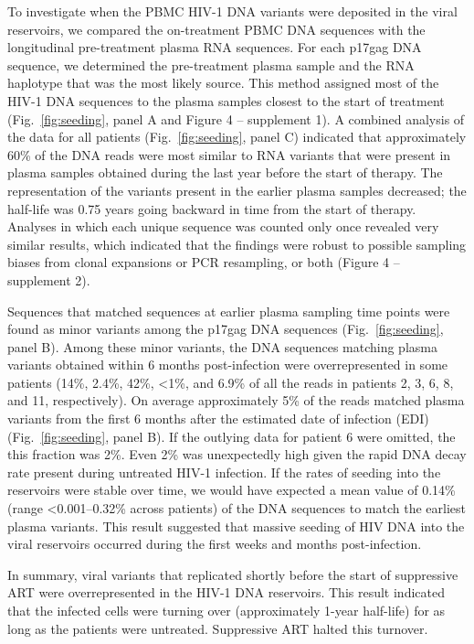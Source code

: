 \documentclass[aps,rmp,onecolumn,linenumbers]{revtex4-1}
\newcommand{\FIG}[1]{Fig.~\ref{fig:#1}}
\begin{document}
To investigate when the PBMC HIV-1 DNA variants were deposited in the viral reservoirs, we compared the on-treatment PBMC DNA sequences with the longitudinal pre-treatment plasma RNA sequences. For each p17gag DNA sequence, we determined the pre-treatment plasma sample and the RNA haplotype that was the most likely source. 
This method assigned most of the HIV-1 DNA sequences to the plasma samples closest to the start of treatment (\FIG{seeding}, panel A and Figure 4 -- supplement 1). 
A combined analysis of the data for all patients (\FIG{seeding}, panel C) indicated that approximately 60\% of the DNA reads were most similar to RNA variants that were present in plasma samples obtained during the last year before the start of therapy. The representation of the variants present in the earlier plasma samples decreased; the half-life was 0.75 years going backward in time from the start of therapy. Analyses in which each unique sequence was counted only once revealed very similar results, which indicated that the findings were robust to possible sampling biases from clonal expansions or PCR resampling, or both (Figure 4 -- supplement 2).

Sequences that matched sequences at earlier plasma sampling time points were found as minor variants among the p17gag DNA sequences (\FIG{seeding}, panel B). Among these minor variants, the DNA sequences matching plasma variants obtained within 6 months post-infection were overrepresented in some patients (14\%, 2.4\%, 42\%, \textless 1\%, and 6.9\% of all the reads in patients 2, 3, 6, 8, and 11, respectively). 
On average approximately 5\% of the reads matched plasma variants from the first 6 months after the estimated date of infection (EDI) (\FIG{seeding}, panel B). If the outlying data for patient 6 were omitted, the this fraction was 2\%. Even 2\% was unexpectedly high given the rapid DNA decay rate present during untreated HIV-1 infection. If the rates of seeding into the reservoirs were stable over time, we would have expected a mean value of 0.14\% (range \textless 0.001–0.32\% across patients) of the DNA sequences to match the earliest plasma variants. This result suggested that massive seeding of HIV DNA into the viral reservoirs occurred during the first weeks and months post-infection. 

In summary, viral variants that replicated shortly before the start of suppressive ART were overrepresented in the HIV-1 DNA reservoirs. This result indicated that the infected cells were turning over (approximately 1-year half-life) for as long as the patients were untreated. Suppressive ART halted this turnover. 
\end{document}
